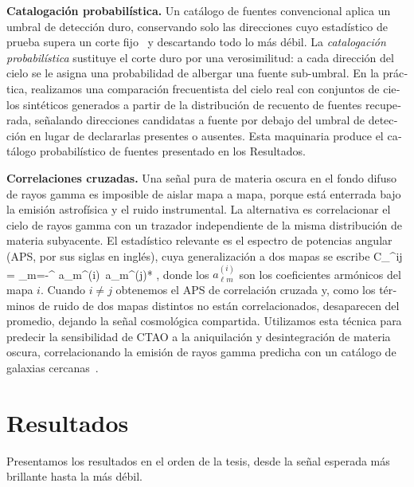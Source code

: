 \begin{otherlanguage}{spanish}
\textbf{Catalogación probabilística.} Un catálogo de fuentes convencional aplica un umbral de detección duro, conservando solo las direcciones cuyo estadístico de prueba supera un corte fijo~\cite{Mattox:1996zz} y descartando todo lo más débil. La \emph{catalogación probabilística} sustituye el corte duro por una verosimilitud: a cada dirección del cielo se le asigna una probabilidad de albergar una fuente sub-umbral. En la práctica, realizamos una comparación frecuentista del cielo real con conjuntos de cielos sintéticos generados a partir de la distribución de recuento de fuentes recuperada, señalando direcciones candidatas a fuente por debajo del umbral de detección en lugar de declararlas presentes o ausentes. Esta maquinaria produce el catálogo probabilístico de fuentes presentado en los Resultados.

\textbf{Correlaciones cruzadas.} Una señal pura de materia oscura en el fondo difuso de rayos gamma es imposible de aislar mapa a mapa, porque está enterrada bajo la emisión astrofísica y el ruido instrumental. La alternativa es correlacionar el cielo de rayos gamma con un trazador independiente de la misma distribución de materia subyacente. El estadístico relevante es el espectro de potencias angular (APS, por sus siglas en inglés), cuya generalización a dos mapas se escribe
\be
C_\ell^{ij} =  \left\langle \sum_{m=-\ell}^{\ell} a_{\ell m}^{(i)}\, a_{\ell m}^{(j)*} \right\rangle,
\ee
donde los $a_{\ell m}^{(i)}$ son los coeficientes armónicos del mapa $i$. Cuando $i \neq j$ obtenemos el APS de correlación cruzada y, como los términos de ruido de dos mapas distintos no están correlacionados, desaparecen del promedio, dejando la señal cosmológica compartida. Utilizamos esta técnica para predecir la sensibilidad de CTAO a la aniquilación y desintegración de materia oscura, correlacionando la emisión de rayos gamma predicha con un catálogo de galaxias cercanas~\cite{Camera:2012cj}.

\section*{Resultados}
Presentamos los resultados en el orden de la tesis, desde la señal esperada más brillante hasta la más débil.


\end{otherlanguage}
